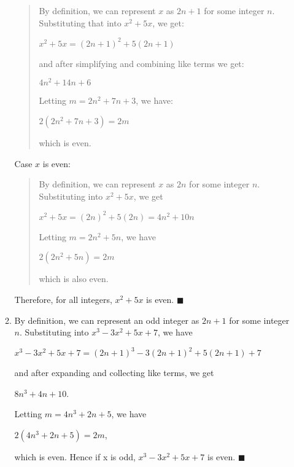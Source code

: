\documentclass[12pt]{article}
\begin{document}
\begin{enumerate}
\begin{enumerate}
		            \begin{quote}
			            By definition, we can represent $x$ as $2n + 1$ for some integer $n$.
			            Substituting that into $x^2+5x$, we get:
			            \begin{center}$x^2+5x = (2n+1)^2 + 5(2n+1)$ \end{center}
			            and after simplifying and combining like terms we get:
			            \begin{center}$4n^2 + 14n + 6$ \end{center}
			            Letting $m = 2n^2 + 7n + 3$, we have:
			            \begin{center}$2(2n^2+7n+3) = 2m$\end{center}
			            which is even.
		            \end{quote}
		            Case $x$ is even:
		            \begin{quote}
			            By definition, we can represent $x$ as $2n$ for some integer $n$.
			            Substituting into $x^2 + 5x$, we get
			            \begin{center}
				            $x^2+5x = (2n)^2 + 5(2n) = 4n^2 + 10n$
			            \end{center}
			            Letting $m = 2n^2 + 5n$, we have
			            \begin{center}
				            $2(2n^2+5n) = 2m$
			            \end{center}
			            which is also even.
		            \end{quote}
		            Therefore, for all integers, $x^2+5x$ is even. \hfill $\blacksquare$
		      \item By definition, we can represent an odd integer as $2n+1$ for some integer $n$.
		            Substituting into $x^3-3x^2+5x+7$, we have
		            \begin{center}
			            $x^3-3x^2+5x+7 = (2n+1)^3-3(2n+1)^2+5(2n+1)+7$
		            \end{center}
		            and after expanding and collecting like terms, we get
		            \begin{center}
			            $8n^3 + 4n + 10$.
		            \end{center}
		            Letting $m = 4n^3 + 2n + 5$, we have
		            \begin{center}
			            $2(4n^3+2n+5) = 2m$,
		            \end{center}
		            which is even. Hence if x is odd, $x^3-3x^2+5x+7$ is even. \hfill $\blacksquare$

\end{enumerate}
\end{enumerate}
\end{document}
